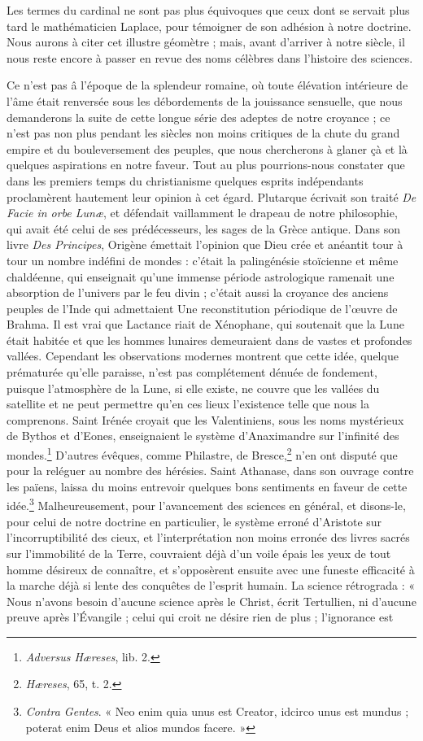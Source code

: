 \documentclass[a4paper, 11pt, oneside]{article}
\begin{document}
Les termes du cardinal ne sont pas plus équivoques que ceux dont se servait plus tard le mathématicien Laplace, pour témoigner de son adhésion à notre doctrine. Nous aurons à citer cet illustre géomètre ; mais, avant d'arriver à notre siècle, il nous reste encore à passer en revue des noms célèbres dans l'histoire des sciences.

Ce n'est pas â l'époque de la splendeur romaine, où toute élévation intérieure de l'âme était renversée sous les débordements de la jouissance sensuelle, que nous demanderons la suite de cette longue série des adeptes de notre croyance ; ce n'est pas non plus pendant les siècles non moins critiques de la chute du grand empire et du bouleversement des peuples, que nous chercherons à glaner çà et là quelques aspirations en notre faveur. Tout au plus pourrions-nous constater que dans les premiers temps du christianisme quelques esprits indépendants proclamèrent hautement leur opinion à cet égard. Plutarque écrivait son traité \emph{De Facie in orbe Lunæ}, et défendait vaillamment le drapeau de notre philosophie, qui avait été celui de ses prédécesseurs, les sages de la Grèce antique. Dans son livre \emph{Des Principes}, Origène émettait l'opinion que Dieu crée et anéantit tour à tour un nombre indéfini de mondes : c'était la palingénésie stoïcienne et même chaldéenne, qui enseignait qu'une immense période astrologique ramenait une absorption de l'univers par le feu divin ; c'était aussi la croyance des anciens peuples de l'Inde qui admettaient Une reconstitution périodique de l'œuvre de Brahma. Il est vrai que Lactance riait de Xénophane, qui soutenait que la Lune était habitée et que les hommes lunaires demeuraient dans de vastes et profondes vallées. Cependant les observations modernes montrent que cette idée, quelque prématurée qu'elle paraisse, n'est pas complétement dénuée de fondement, puisque l'atmosphère de la Lune, si elle existe, ne couvre que les vallées du satellite et ne peut permettre qu'en ces lieux l'existence telle que nous la comprenons. Saint Irénée croyait que les Valentiniens, sous les noms mystérieux de Bythos et d'Eones, enseignaient le système d'Anaximandre sur l'infinité des mondes.\footnote{\emph{Adversus Hæreses}, lib. 2.} D'autres évêques, comme Philastre, de Bresce,\footnote{\emph{Hæreses}, 65, t. 2.} n'en ont disputé que pour la reléguer au nombre des hérésies. Saint Athanase, dans son ouvrage contre les païens, laissa du moins entrevoir quelques bons sentiments en faveur de cette idée.\footnote{\emph{Contra Gentes}. « Neo enim quia unus est Creator, idcirco unus est mundus ; poterat enim Deus et alios mundos facere. »} Malheureusement, pour l'avancement des sciences en général, et disons-le, pour celui de notre doctrine en particulier, le système erroné d'Aristote sur l'incorruptibilité des cieux, et l'interprétation non moins erronée des livres sacrés sur l'immobilité de la Terre, couvraient déjà d'un voile épais les yeux de tout homme désireux de connaître, et s'opposèrent ensuite avec une funeste efficacité à la marche déjà si lente des conquêtes de l'esprit humain. La science rétrograda : « Nous n'avons besoin d'aucune science après le Christ, écrit Tertullien, ni d'aucune preuve après l'Évangile ; celui qui croit ne désire rien de plus ; l'ignorance est 
\end{document}
